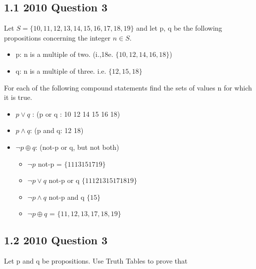 \documentclass{article}
\begin{document}
\begin{center}
\subsection*{1.1 2010 Question 3}
Let $S = \{10,11,12,13,14,15,16,17,18,19\}$ and let p, q be the following propositions concerning the integer $n \in S$.

\begin{itemize}
\item p: n is a multiple of two. (i.,18e. $\{10,12,14,16,18\}$)
\item q: n is a multiple of three. {i.e. $\{12,15,18\}$}
\end{itemize}

For each of the following compound statements find the sets of values n for which it is true. 

\begin{itemize}
\item $p \vee q$ : (p or q :  10 12 14 15 16 18) 
\item $p \wedge q$: (p and q: 12 18)
\item $ \neg p \oplus q$: (not-p or q, but not both)
\begin{itemize}
\item $\neg p $ not-p = $\{ 11 13 15 17 19\}$
\item $\neg p \vee q$ not-p or q $\{11 12 13 15 17 18 19\}$
\item $\neg p \wedge q$ not-p and q $\{15\} $
\item $ \neg p \oplus q$ = $\{11, 12, 13, 17, 18, 19\}$
\end{itemize}
\end{itemize}

\subsection*{1.2 2010 Question 3}

Let p and q be propositions. Use Truth Tables to prove that


\end{center}
\end{document}
